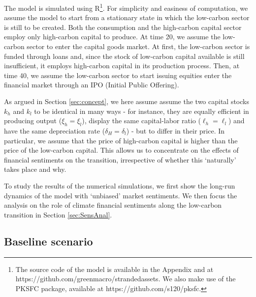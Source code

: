 \documentclass[authoryear]{article}
\begin{document}
The model is simulated using R\footnote{The source code of the model is available in the Appendix and at https://github.com/greenmacro/strandedassets. We also make use of the PKSFC package, available at https://github.com/s120/pksfc.}. For simplicity and easiness of computation, we assume the model to start from a stationary state in which the low-carbon sector is still to be created. Both the consumption and the high-carbon capital sector employ only high-carbon capital to produce. At time 20, we assume the low-carbon sector to enter the capital goods market. At first, the low-carbon sector is funded through loans and, since the stock of low-carbon capital available is still insufficient, it employs high-carbon capital in its production process. Then, at time 40, we assume the low-carbon sector to start issuing equities enter the financial market through an IPO (Initial Public Offering).

As argued in Section \ref{sec:concept}, we here assume assume the two capital stocks $k_h$ and $k_l$ to be identical in many ways - for instance, they are equally efficient in producing output ($\xi_h=\xi_l$), display the same capital-labor ratio ($\ell_h=\ell_l$) and have the same depreciation rate ($\delta_H=\delta_l$) - but to differ in their price. In particular, we assume that the price of high-carbon capital is higher than the price of the low-carbon capital. This allows us to concentrate on the effects of financial sentiments on the transition, irrespective of whether this `naturally' takes place and why.

To study the results of the numerical simulations, we first show the long-run dynamics of the model with `unbiased' market sentiments. We then focus the analysis on the role of climate financial sentiments along the low-carbon transition in Section \ref{sec:SensAnal}. 


\subsection{Baseline scenario}
\label{sec:BAUsim}
\end{document}
